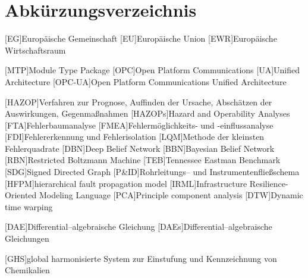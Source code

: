 \chapter*{Abk\"urzungsverzeichnis}
\begin{acronym}[12. BImSchV] %
	[EG]{Europ\"aische Gemeinschaft} %
	[EU]{Europ\"aische Union} %
	[EWR]{Europ\"aische Wirtschaftsraum }
	
  [MTP]{Module Type Package}	
  [OPC]{Open Platform Communications}
  [UA]{Unified Architecture}
  [OPC-UA]{Open Platform Communications Unified Architecture}
	
	[HAZOP]{Verfahren zur Prognose, Auffinden der Ursache, Absch\"atzen der Auswirkungen, Gegenma\ss{}nahmen }
	[HAZOPs]{Hazard and Operability Analyses}
	[FTA]{Fehlerbaumanalyse }
	[FMEA]{Fehlerm\"oglichkeits- und -einflussanalyse }
	[FDI]{Fehlererkennung und Fehlerisolation }
	[LQM]{Methode der kleinsten Fehlerquadrate }
	[DBN]{Deep Belief Network}
	[BBN]{Bayesian Belief Network}
	[RBN]{Restricted Boltzmann Machine}
	[TEB]{Tennessee Eastman Benchmark}
	[SDG]{Signed Directed Graph}
	[P\&{}ID]{Rohrleitungs-- und Instrumentenflie\ss{}schema }
	[HFPM]{hierarchical fault propagation model}
	[IRML]{Infrastructure Resilience-Oriented Modeling Language}
	[PCA]{Principle component analysis}
	[DTW]{Dynamic time warping}
	
	[DAE]{Differential--algebraische Gleichung }
	[DAEs]{Differential--algebraische Gleichungen }
	
	[GHS]{global harmonisierte System zur Einstufung und Kennzeichnung von Chemikalien}
		

\end{acronym}
